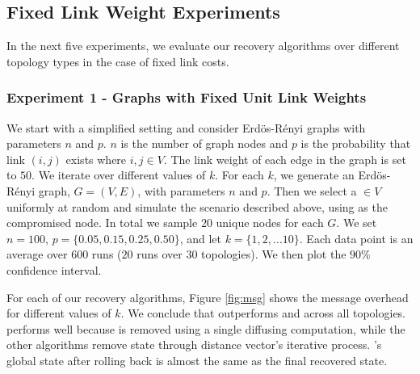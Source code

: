 \subsection{Fixed Link Weight Experiments}
\label{subsec:fixed}

In the next five experiments, we evaluate our recovery algorithms over different topology types in the case of fixed link costs.

\subsubsection{Experiment 1 - \er Graphs with Fixed Unit Link Weights}
\label{subsubsec:expt1}

We start with a simplified setting and consider 
Erd\"{o}s-R\'enyi graphs with parameters $n$ and $p$. 
$n$ is the number of graph nodes and $p$ is the probability that link $(i,j)$ exists where $i,j \in V$.
The link weight of each edge in the graph is set to $50$.
We iterate over different values of $k$. For each $k$, we 
generate an Erd\"{o}s-R\'enyi graph, $G = (V,E)$, with parameters $n$ and $p$. Then we select a \bad $\in V$ uniformly at random and simulate the scenario described above, 
using \bad as the compromised node. In total we sample $20$ unique nodes for each $G$.
We set $n=100$, $p=\{0.05,0.15,0.25, 0.50\}$, and let $k=\{1,2,
... 10\}$. Each data point is an average over $600$ runs ($20$ runs over 
$30$ topologies).  We then plot the $90 \%$ confidence interval.

For each of our recovery algorithms, Figure \ref{fig:msg} shows the
message overhead for different values of $k$. %
We conclude that \cpr outperforms \purge and \second across all topologies. \cpr performs well because \badvector is removed using a single diffusing computation,  
while the other algorithms remove \badvector state through distance vector's iterative process.
\cprs's global state after rolling back is almost the same as the final recovered state.

\begin{figure*}[t]
\centering
{}
\caption{Experiment 1: message overhead for \er Graphs with Fixed Unit Link Weights generated over different $p$ values. Note the y-axis have different scales.}
\label{fig:msg}
\end{figure*}

